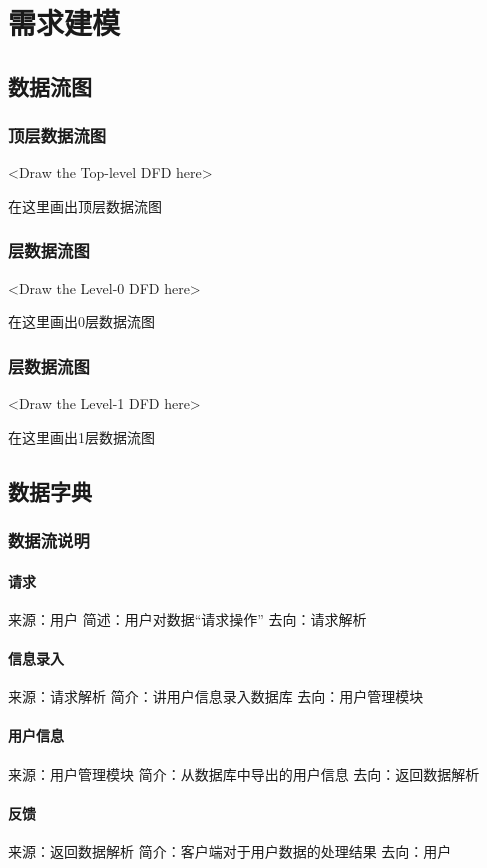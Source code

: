 \chapter{需求建模 }
\section{数据流图}
\subsection{顶层数据流图}
<Draw the Top-level DFD here>

在这里画出顶层数据流图

\subsection{层数据流图}
<Draw the Level-0 DFD here>

在这里画出0层数据流图

\subsection{层数据流图}
<Draw the Level-1 DFD here>

在这里画出1层数据流图

\section{数据字典}
\subsection{数据流说明}
\subsubsection{请求}
来源：用户
简述：用户对数据“请求操作”
去向：请求解析

\subsubsection{信息录入}
来源：请求解析
简介：讲用户信息录入数据库
去向：用户管理模块

\subsubsection{用户信息}
来源：用户管理模块
简介：从数据库中导出的用户信息
去向：返回数据解析

\subsubsection{反馈}
来源：返回数据解析
简介：客户端对于用户数据的处理结果
去向：用户

